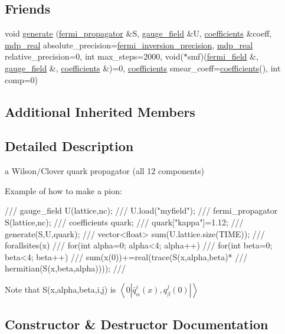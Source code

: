 \subsection*{Friends}
\begin{DoxyCompactItemize}
\item 
void \hyperlink{classfermi__propagator_a0b3730ff1e1058f1e13b537d429c7333}{generate} (\hyperlink{classfermi__propagator}{fermi\+\_\+propagator} \&S, \hyperlink{classgauge__field}{gauge\+\_\+field} \&U, \hyperlink{classcoefficients}{coefficients} \&coeff, \hyperlink{mdp__global__vars_8h_a69d96b74c791e0bbdb888b3913a69450}{mdp\+\_\+real} absolute\+\_\+precision=\hyperlink{fermiqcd__default__parameters_8h_ab11c95dc923c6bfd349bd67af277d59d}{fermi\+\_\+inversion\+\_\+precision}, \hyperlink{mdp__global__vars_8h_a69d96b74c791e0bbdb888b3913a69450}{mdp\+\_\+real} relative\+\_\+precision=0, int max\+\_\+steps=2000, void($\ast$smf)(\hyperlink{classfermi__field}{fermi\+\_\+field} \&, \hyperlink{classgauge__field}{gauge\+\_\+field} \&, \hyperlink{classcoefficients}{coefficients} \&)=0, \hyperlink{classcoefficients}{coefficients} smear\+\_\+coeff=\hyperlink{classcoefficients}{coefficients}(), int comp=0)
\end{DoxyCompactItemize}
\subsection*{Additional Inherited Members}


\subsection{Detailed Description}
a Wilson/\+Clover quark propagator (all 12 components) 

Example of how to make a pion\+: \begin{DoxyVerb}/// gauge_field U(lattice,nc);
/// U.load("myfield");
/// fermi_propagator S(lattice,nc);
/// coefficients quark;
/// quark["kappa"]=1.12;
/// generate(S,U,quark);
/// vector<float> sum(U.lattice.size(TIME));
/// forallsites(x) 
///   for(int alpha=0; alpha<4; alpha++)
///     for(int beta=0; beta<4; beta++)
///        sum(x(0))+=real(trace(S(x,alpha,beta)*
///                   hermitian(S(x,beta,alpha))));
/// \end{DoxyVerb}
 Note that S(x,alpha,beta,i,j) is $ \left<0|\bar q^i_\alpha(x), q^j_\beta(0)|\right> $ 

\subsection{Constructor \& Destructor Documentation}
\mbox{\label{classfermi__propagator_a55bbd357d5ffd3b57f835dab4a06d261}} 
